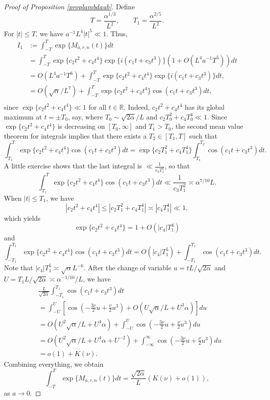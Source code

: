 \documentclass[10pt,a4paper]{amsart}
\begin{document}
\begin{proof}[Proof of Proposition \ref{proplambdaub}]
Define
$$
T=\frac{\alpha^{1/3}}{L^2}, \qquad T_1 = \frac{\alpha^{2/5}}{L^2}.
$$
For $|t|\le T$, we have $a^{-1}  L^4 |t|^5 \ll 1$. Thus,
\begin{equation*}
\begin{split}
 I_1 & := \int_{-T}^T \exp\{ M_{a,r,n}(t) \} dt   \\
& =\int_{-T}^T \exp\{c_2 t^2 + c_4 t^4\} \exp\{i(c_1 t + c_3 t^3)\} (1+O(L^4 a^{-1} T^5)) dt \\
& = O(L^4  a^{-1}  T^6)+ \int_{-T}^T \exp\{c_2 t^2 + c_4 t^4\}\exp\{i(c_1 t + c_3 t^3)\} dt, \\
& = O(\sqrt{\alpha}/L^7)+ \int_{-T}^T \exp\{c_2 t^2 + c_4 t^4\} \cos(c_1 t + c_3 t^3) dt, \\
\end{split}
\end{equation*}
since $ \exp\{c_2 t^2 + c_4 t^4\} \ll 1$ for all $t\in \mathbb{R}$.
Indeed, $c_2 t^2 + c_4 t^4$ has its global maximum at $t=\pm T_0$, say, where $T_0 \sim  \sqrt{2\alpha}/L$ and 
$c_2 T_0^2 +c_4 T_0^4 \ll 1$. 
Since $ \exp\{c_2 t^2 + c_4 t^4\}$ is decreasing on $[T_0, \infty]$ and $T_1>T_0$, the second mean value theorem for integrals 
implies that there exists a $T_2 \in [T_1,T]$ such that
$$
\int_{T_1}^T \exp\{c_2 t^2 + c_4 t^4\} \cos(c_1 t + c_3 t^3) dt
= \exp\{c_2 T_1^2 + c_4 T_1^4\} \int_{T_1}^{T_2} \cos(c_1 t + c_3 t^3) dt.
$$
A little exercise shows that the last integral is $\ll \frac{1}{c_3 T_1^2}$, so that 
$$
\int_{T_1}^T \exp\{c_2 t^2 + c_4 t^4\} \cos(c_1 t + c_3 t^3) dt \ll \frac{ 1}{c_3 T_1^2}\asymp \alpha^{7/10}L .
$$
When $|t| \le T_1$, we have
$$
|c_2 t^2 + c_4 t^4| \le |c_2 T_1^2 + c_4 T_1^4|  \asymp |c_4 T_1^4| \ll 1,
$$
which yields
$$
\exp\{c_2 t^2 + c_4 t^4\} = 1+ O( |c_4| T_1^4) 
$$
and
$$
 \int_{-T_1}^{T_1} \exp\{c_2 t^2 + c_4 t^4\} \cos(c_1 t + c_3 t^3) dt = O(|c_4| T_1^5)+ \int_{-T_1}^{T_1} \cos(c_1 t + c_3 t^3) dt .
$$
Note that $|c_4| T_1^5 \asymp \sqrt{\alpha} L^{-6}$. 
After the change of variable $u=t L/\sqrt{2 \alpha}$ and $U=T_1 L/\sqrt{2 \alpha} \asymp \alpha^{-1/10} /L$, 
 we have
\begin{equation*}
\begin{split}
&\frac{L}{\sqrt{2\alpha}}\int_{-T_1}^{T_1} \cos(c_1 t + c_3 t^3) dt\\
& =  \int_{-U}^U \left[\cos\left( -\frac{3\nu}{2}u +\frac{\nu}{2}u^3 \right) +O(U\sqrt{\alpha}/L+U^3 \alpha)\right] du\\
 & = O(  U^2 \sqrt{\alpha}/L + U^4 \alpha)+  \int_{-U}^U \cos\left( -\frac{3\nu}{2}u +\frac{\nu}{2}u^3 \right) du\\
 & = O(U^2 \sqrt{\alpha}/L  + U^4 \alpha +U^{-2})+  \int_{-\infty}^\infty \cos\left( -\frac{3\nu}{2}u +\frac{\nu}{2}u^3 \right) du\\
 &  = o(1)+  K(\nu).
\end{split}
\end{equation*}
Combining everything, we obtain
$$
  \int_{-T}^T \exp\{ M_{a,r,n}(t) \} dt = \frac{\sqrt{2\alpha}}{L} ( K(\nu) + o(1)),
$$
as $a \to 0$. 


\end{proof}
\end{document}
